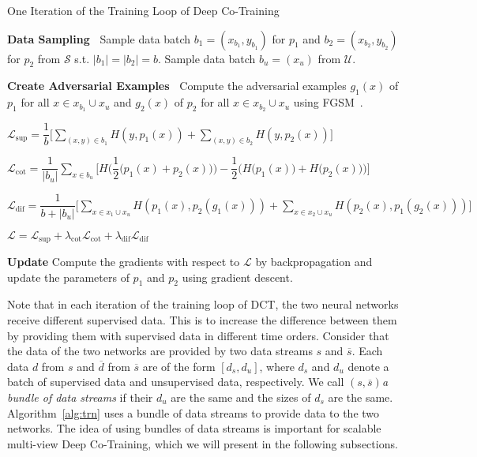 \documentclass[runningheads]{llncs}
\begin{document}
\begin{algorithm}
\caption{One Iteration of the Training Loop of Deep Co-Training}\label{alg:trn}{\bf Data Sampling~} Sample data batch $b_1=(x_{b_1}, y_{b_1})$ for $p_1$ and $b_2=(x_{b_2}, y_{b_2})$ for $p_2$ from $\mathcal{S}$ s.t. $|b_1|=|b_2|=b$.
Sample data batch $b_u=(x_u)$ from $\mathcal{U}$.

{\bf Create Adversarial Examples~} Compute the adversarial examples $g_1(x)$ of $p_1$ for all $x\in x_{b_1}\cup x_u$ and $g_2(x)$ of $p_2$ for all $x\in x_{b_2}\cup x_u$ using FGSM~\cite{adv}.

$\mathcal{L}_{\text{sup}} = \dfrac{1}{b}\Big[\displaystyle\sum_{(x, y)\in b_1}H(y, p_1(x)) + \displaystyle\sum_{(x, y)\in b_2}H(y, p_2(x))\Big]$

$\mathcal{L}_{\text{cot}} = \dfrac{1}{|b_u|}\displaystyle\sum_{x\in b_u} \Big[H\Big(\dfrac{1}{2}\big(p_1(x) + p_2(x)\big)\Big) - \dfrac{1}{2}\Big(H\big(p_1(x) \big) + H\big(p_2(x)\big)\Big)\Big]$

$\mathcal{L}_{\text{dif}} = \dfrac{1}{b + |b_u|}\Big[\displaystyle\sum_{x\in x_1\cup x_u} H(p_1(x), p_2(g_1(x))) + \displaystyle\sum_{x\in x_2\cup x_u} H(p_2(x), p_1(g_2(x)))\Big]$

$\mathcal{L} = \mathcal{L}_{\text{sup}} + \lambda_{\text{cot}}\mathcal{L}_{\text{cot}} +
\lambda_{\text{dif}}\mathcal{L}_{\text{dif}}$

{\bf Update} Compute the gradients with respect to $\mathcal{L}$ by backpropagation and update the parameters of $p_1$ and $p_2$ using gradient descent.
\end{algorithm}

Note that in each iteration of the training loop of DCT, the two neural networks receive different supervised data.
This is to increase the difference between them by providing them with supervised data in different time orders.
Consider that the data of the two networks are provided by two data streams $s$ and $\overline{s}$.
Each data $d$ from $s$ and $\overline{d}$ from $\overline{s}$ are of the form $[d_{s}, d_{u}]$, where $d_{s}$ and $d_{u}$ denote a batch of supervised data and unsupervised data, respectively.
We call $(s, \overline{s})$\emph{a bundle of data streams} if their $d_{u}$ are the same and the sizes of $d_{s}$ are the same.
Algorithm~\ref{alg:trn} uses a bundle of data streams to provide data to the two networks.
The idea of using bundles of data streams is important for scalable multi-view Deep Co-Training, which we will present in the following subsections.
\end{document}

